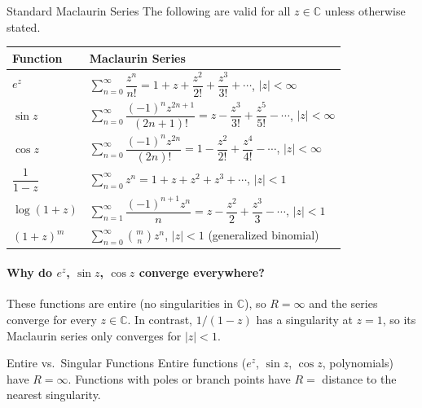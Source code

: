 \documentclass[12pt,a4paper]{article}
\begin{document}
\begin{infobox}{Standard Maclaurin Series}
The following are valid for all $z \in \mathbb{C}$ unless otherwise stated.

\medskip
\begin{tabular}{ll}
\toprule
\textbf{Function} & \textbf{Maclaurin Series} \\
\midrule
$e^z$ & $\displaystyle\sum_{n=0}^{\infty}\dfrac{z^n}{n!} = 1 + z + \dfrac{z^2}{2!} + \dfrac{z^3}{3!} + \cdots$, \quad $|z| < \infty$ \\[8pt]
$\sin z$ & $\displaystyle\sum_{n=0}^{\infty}\dfrac{(-1)^n z^{2n+1}}{(2n+1)!} = z - \dfrac{z^3}{3!} + \dfrac{z^5}{5!} - \cdots$, \quad $|z| < \infty$ \\[8pt]
$\cos z$ & $\displaystyle\sum_{n=0}^{\infty}\dfrac{(-1)^n z^{2n}}{(2n)!} = 1 - \dfrac{z^2}{2!} + \dfrac{z^4}{4!} - \cdots$, \quad $|z| < \infty$ \\[8pt]
$\dfrac{1}{1-z}$ & $\displaystyle\sum_{n=0}^{\infty} z^n = 1 + z + z^2 + z^3 + \cdots$, \quad $|z| < 1$ \\[8pt]
$\log(1+z)$ & $\displaystyle\sum_{n=1}^{\infty}\dfrac{(-1)^{n+1}z^n}{n} = z - \dfrac{z^2}{2} + \dfrac{z^3}{3} - \cdots$, \quad $|z| < 1$ \\[8pt]
$(1+z)^m$ & $\displaystyle\sum_{n=0}^{\infty}\binom{m}{n}z^n$, \quad $|z| < 1$ (generalized binomial) \\
\bottomrule
\end{tabular}
\end{infobox}

\paragraph{Why do $e^z$, $\sin z$, $\cos z$ converge everywhere?} These functions are entire (no singularities in $\mathbb{C}$), so $R = \infty$ and the series converge for every $z \in \mathbb{C}$. In contrast, $1/(1-z)$ has a singularity at $z = 1$, so its Maclaurin series only converges for $|z| < 1$.

\begin{learnbox}{Entire vs.\ Singular Functions}
Entire functions ($e^z$, $\sin z$, $\cos z$, polynomials) have $R=\infty$. Functions with poles or branch points have $R = $ distance to the nearest singularity.
\end{learnbox}

\end{document}
